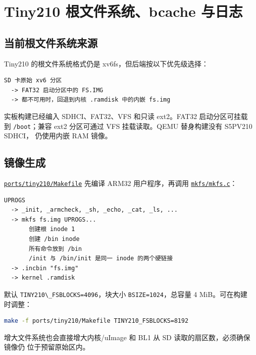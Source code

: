 \chapter{Tiny210 根文件系统、bcache
与日志}\label{tiny210-ux6839ux6587ux4ef6ux7cfbux7edfbcache-ux4e0eux65e5ux5fd7}

\section{当前根文件系统来源}\label{ux5f53ux524dux6839ux6587ux4ef6ux7cfbux7edfux6765ux6e90}

Tiny210 的根文件系统格式仍是 xv6fs，但后端按以下优先级选择：

\begin{lstlisting}
SD 卡原始 xv6 分区
  -> FAT32 启动分区中的 FS.IMG
  -> 都不可用时，回退到内核 .ramdisk 中的内嵌 fs.img
\end{lstlisting}

实板构建已经编入 SDHCI、FAT32、VFS 和只读 ext2。FAT32 启动分区可挂载到
\passthrough{\lstinline!/boot!}；兼容 ext2 分区可通过 VFS 挂载读取。QEMU
替身构建没有 S5PV210 SDHCI， 仍使用内嵌 RAM 镜像。

\section{镜像生成}\label{ux955cux50cfux751fux6210}

\href{../../../ports/tiny210/Makefile}{\passthrough{\lstinline!ports/tiny210/Makefile!}}
先编译 ARM32 用户程序，再调用
\href{../../../mkfs/mkfs.c}{\passthrough{\lstinline!mkfs/mkfs.c!}}：

\begin{lstlisting}
UPROGS
  -> _init, _armcheck, _sh, _echo, _cat, _ls, ...
  -> mkfs fs.img UPROGS...
       创建根 inode 1
       创建 /bin inode
       所有命令放到 /bin
       /init 与 /bin/init 是同一 inode 的两个硬链接
  -> .incbin "fs.img"
  -> kernel .ramdisk
\end{lstlisting}

默认 \passthrough{\lstinline!TINY210\_FSBLOCKS=4096!}，块大小
\passthrough{\lstinline!BSIZE=1024!}，总容量 4 MiB。可在构建时调整：

\begin{lstlisting}[language=sh]
make -f ports/tiny210/Makefile TINY210_FSBLOCKS=8192
\end{lstlisting}

增大文件系统也会直接增大内核/uImage 和 BL1 从 SD
读取的扇区数，必须确保镜像仍 位于预留原始区内。

